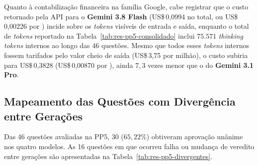 Quanto à contabilização financeira na família Google, cabe registrar que o custo retornado pela API para o \textbf{Gemini 3.8 Flash} (US\$\,0,0994 no total, ou US\$\,0,00226 por ) incide sobre os \textit{tokens} visíveis de entrada e saída, enquanto o total de \textit{tokens} reportado na Tabela~\ref{tab:res-pp5-consolidado} inclui $75.571$ \textit{thinking tokens} internos ao longo das 46 questões. Mesmo que todos esses \textit{tokens} internos fossem tarifados pelo valor cheio de saída (US\$\,3,75 por milhão), o custo subiria para US\$\,0,3828 (US\$\,0,00870 por ), ainda $7{,}3$ vezes menor que o do \textbf{Gemini 3.1 Pro}.

\subsection{Mapeamento das Questões com Divergência entre Gerações}\label{sec:res-rq5-fases}

Das 46 questões avaliadas na PP5, 30 ($65{,}22\%$) obtiveram aprovação unânime nos quatro modelos. As 16 questões em que ocorreu falha ou mudança de veredito entre gerações são apresentadas na Tabela~\ref{tab:res-pp5-divergentes}.

